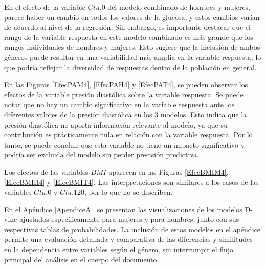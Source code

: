 En el efecto de la variable $Glu.0$ del modelo combinado de hombres y mujeres, parece haber un cambio en todos los valores de la glucosa, y estos cambios varían de acuerdo al nivel de la regresión. Sin embargo, es importante destacar que el rango de la variable respuesta en este modelo combinado es más grande que los rangos individuales de hombres y mujeres. Esto sugiere que la inclusión de ambos géneros puede resultar en una variabilidad más amplia en la variable respuesta, lo que podría reflejar la diversidad de respuestas dentro de la población en general. 

En las Figuras \ref{EfecPAM4}, \ref{EfecPAH4} y \ref{EfecPAT4}, se pueden observar los efectos de la variable presión diastólica sobre la variable respuesta. Se puede notar que no hay un cambio significativo en la variable respuesta ante los diferentes valores de la presión diastólica en los $3$ modelos. Esto indica que la presión diastólica no aporta información relevante al modelo, ya que su contribución es prácticamente nula en relación con la variable respuesta. Por lo tanto, se puede concluir que esta variable no tiene un impacto significativo y podría ser excluida del modelo sin perder precisión predictiva.

Los efectos de las variables $BMI$ aparecen en las Figuras \ref{EfecBMIM4}, \ref{EfecBMIH4} y \ref{EfecBMIT4}. Las interpretaciones son similares a los casos de las variables $Glu.0$ y $Glu.120$, por lo que no se describen. 

En el Apéndice \ref{ApendiceA}, se presentan las visualizaciones de los modelos D-vine ajustados específicamente para mujeres y para hombres, junto con sus respectivas tablas de probabilidades. La inclusión de estos modelos en el apéndice permite una evaluación detallada y comparativa de las diferencias y similitudes en la dependencia entre variables según el género, sin interrumpir el flujo principal del análisis en el cuerpo del documento.